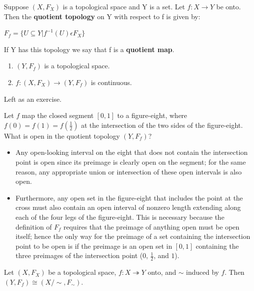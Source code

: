 \begin{definition}
 Suppose $(X,F_{X})$ is a topological space and Y is a set. Let $f: X \to Y$ be onto.  Then the {\bf quotient topology} on Y with respect to f is given by:
\begin{center}
$F_{f}=\{U \subseteq Y | f^{-1}(U) \epsilon F_{X}\}$
\end{center}
If Y has this topology we say that f is a {\bf quotient map}.
\end{definition}

\begin{tinyfact}
\begin{enumerate}
	\item $(Y,F_f)$ is a topological space.
	\item $f: (X,F_X) \rightarrow (Y,F_f)$ is continuous. 
\end{enumerate}
\end{tinyfact}
\proof Left as an exercise.

\begin{example}
 Let $f$ map the closed segment $[0,1]$ to a figure-eight, where $f(0)=f(1)=f(\frac{1}{2})$ at the intersection of the two sides of the figure-eight. What is open in the quotient topology $(Y,F_f)$? 
\end{example}
\begin{itemize}
	\item Any open-looking interval on the eight that does not contain the intersection point is open since its preimage is clearly open on the segment; for the same reason, any appropriate union or intersection of these open intervals is also open.
	\item Furthermore, any open set in the figure-eight that includes the point at the cross must also contain an open interval of nonzero length extending along each of the four legs of the figure-eight. This is necessary because the definition of $F_f$ requires that the preimage of anything open must be open itself; hence the only way for the preimage of a set containing the intersection point to be open is if the preimage is an open set in $[0,1]$ containing the three preimages of the intersection point ($0$, $\frac{1}{2}$, and $1$).
\end{itemize}

\placeholder

\begin{theorem}
Let $(X,F_X)$ be a topological space, $f: X \twoheadrightarrow Y$ onto, and $\sim$ induced by $f$. Then $(Y,F_f) \cong (X/\sim,F_\sim)$.
\end{theorem}


